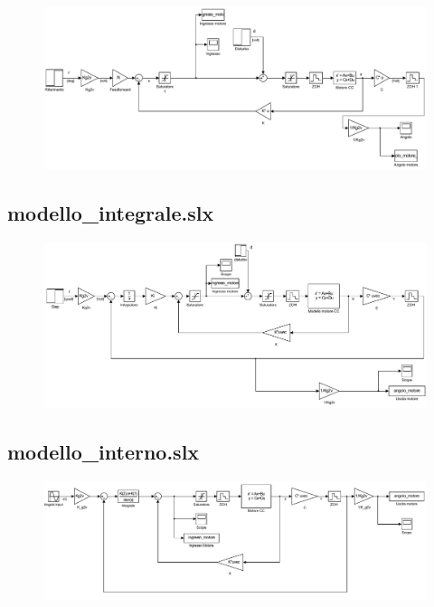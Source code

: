 		\begin{figure}[H]
			\centering
			\includegraphics[scale=0.6]{./Figure/SIMULINK/modello_feedforward.pdf}
		\end{figure}			
		
	\subsection{modello\_integrale.slx}
	\label{subapp:modelloIntegrale}
	
		\begin{figure}[H]
			\centering
			\includegraphics[scale=0.6]{./Figure/SIMULINK/modello_integrale.pdf}
		\end{figure}	
		
	\subsection{modello\_interno.slx}
	\label{subapp:modelloInterno}
	
		\begin{figure}[H]
			\centering
			\includegraphics[scale=0.6]{./Figure/SIMULINK/modello_motore_modello_interno.pdf}
		\end{figure}	
		